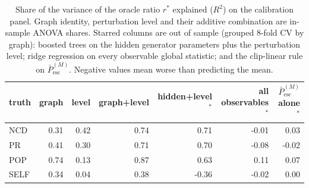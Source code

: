 \begin{table}[t]
\centering
\footnotesize
\caption{Share of the variance of the oracle ratio $r^*$ explained ($R^2$) on the calibration panel. Graph identity, perturbation level and their additive combination are in-sample ANOVA shares. Starred columns are out of sample (grouped 8-fold CV by graph): boosted trees on the hidden generator parameters plus the perturbation level; ridge regression on every observable global statistic; and the clip-linear rule on $\bar P^{(M)}_{\mathrm{esc}}$. Negative values mean worse than predicting the mean.}
\label{tab:stage1dec}
\begin{tabular}{@{}lrrrrrr@{}}
\toprule
truth & graph & level & graph+level & hidden+level$^{*}$ & all observables$^{*}$ & $\bar P^{(M)}_{\mathrm{esc}}$ alone$^{*}$ \\
\midrule
NCD & 0.31 & 0.42 & 0.74 & 0.71 & -0.01 & 0.03 \\
PR & 0.41 & 0.30 & 0.71 & 0.70 & -0.08 & -0.02 \\
POP & 0.74 & 0.13 & 0.87 & 0.63 & 0.11 & 0.07 \\
SELF & 0.34 & 0.04 & 0.38 & -0.36 & -0.02 & 0.00 \\
\bottomrule
\end{tabular}
\end{table}
